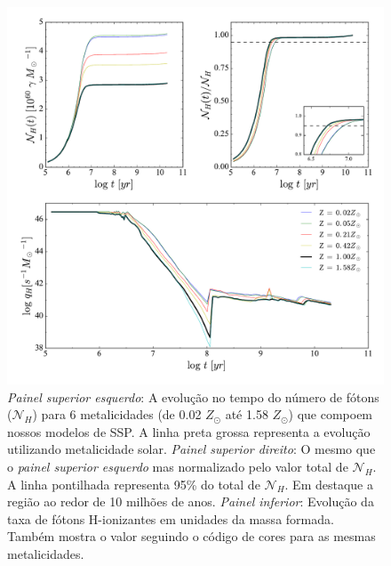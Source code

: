 \begin{figure}
	\centering
	\includegraphics[scale=0.62]{figuras/Nh_logt_metBase_Padova2000_salp.pdf}
	\caption[Evolução temporal do número e da taxa de fótons H-ionizantes em unidades da massa
	formada.]
	{\emph{Painel superior esquerdo}: A	evolução no tempo do número de fótons ($\mathcal{N}_H$) para 6
metalicidades (de 0.02 $Z_\odot$ até 1.58 $Z_\odot$) que compoem nossos modelos de SSP. A linha
preta grossa representa a evolução utilizando metalicidade solar. \emph{Painel superior direito}:
O mesmo que o \emph{painel superior esquerdo} mas normalizado pelo valor total de $\mathcal{N}_H$.
A linha pontilhada representa 95\% do total de $\mathcal{N}_H$. Em destaque a região ao redor de 10
milhões de anos. \emph{Painel inferior}: Evolução da taxa de fótons H-ionizantes em unidades da
massa formada.
Também mostra o valor seguindo o código de cores para as mesmas metalicidades.}
	\label{fig:Nh_qh}
\end{figure}

